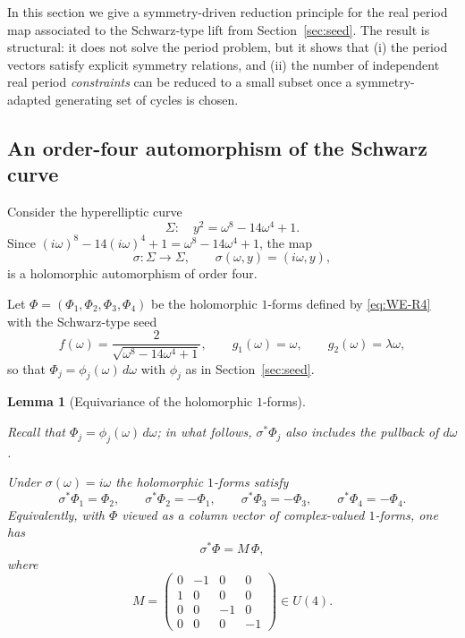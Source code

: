 \documentclass[12pt]{article}
\numberwithin{equation}{section}
\newtheorem{lemma}[theorem]{Lemma}
\theoremstyle{definition}
\theoremstyle{remark}
\begin{document}
In this section we give a symmetry-driven reduction principle for the real period map associated to the Schwarz-type lift from Section~\ref{sec:seed}.  The result is structural: it does not solve the period problem, but it shows that (i) the period vectors satisfy explicit symmetry relations, and (ii) the number of independent real period \emph{constraints} can be reduced to a small subset once a symmetry-adapted generating set of cycles is chosen.

\subsection{An order-four automorphism of the Schwarz curve}

Consider the hyperelliptic curve
\[
\Sigma:\quad y^2=\omega^8-14\omega^4+1.
\]
Since $(i\omega)^8-14(i\omega)^4+1=\omega^8-14\omega^4+1$, the map
\[
\sigma:\Sigma\to\Sigma,\qquad \sigma(\omega,y)=(i\omega,y),
\]
is a holomorphic automorphism of order four.

Let $\Phi=(\Phi_1,\Phi_2,\Phi_3,\Phi_4)$ be the holomorphic $1$-forms defined by \eqref{eq:WE-R4} with the Schwarz-type seed
\[
f(\omega)=\frac{2}{\sqrt{\omega^8-14\omega^4+1}},\qquad g_1(\omega)=\omega,\qquad g_2(\omega)=\lambda\omega,
\]
so that $\Phi_j=\phi_j(\omega)\,d\omega$ with $\phi_j$ as in Section~\ref{sec:seed}.

\begin{lemma}[Equivariance of the holomorphic $1$-forms]\label{lem:equivariance_correct}

Recall that $\Phi_j=\phi_j(\omega)\,d\omega$; in what follows, $\sigma^*\Phi_j$ also includes the pullback of $d\omega$.

Under $\sigma(\omega)=i\omega$ the holomorphic $1$-forms satisfy
\begin{equation}\label{eq:sigma_on_Phi}
\sigma^*\Phi_1=\Phi_2,\qquad
\sigma^*\Phi_2=-\Phi_1,\qquad
\sigma^*\Phi_3=-\Phi_3,\qquad
\sigma^*\Phi_4=-\Phi_4.
\end{equation}
Equivalently, with $\Phi$ viewed as a column vector of complex-valued $1$-forms, one has
\[
\sigma^*\Phi = M\,\Phi,
\]
where
\[
M=
\begin{pmatrix}
0 & -1 & 0 & 0\\
1 &  0 & 0 & 0\\
0 & 0 & -1 & 0\\
0 & 0 & 0 & -1
\end{pmatrix}
\in U(4).
\]
\end{lemma}
\end{document}
